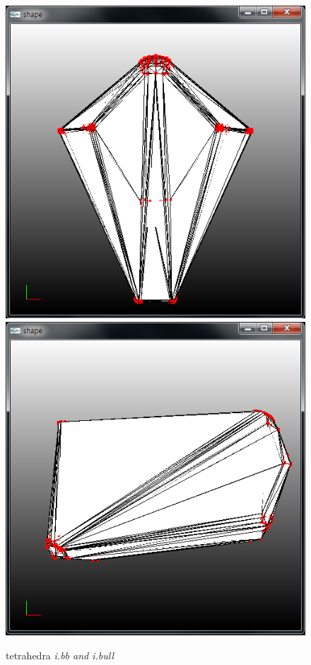 \documentclass[11pt]{article}
\begin{document}
\begin{figure}[h]
\includegraphics[width=.5\textwidth]{FIGS/ibb-tetra}
\hspace{1cm}
\includegraphics[width=.5\textwidth]{FIGS/ibull-tetra}
\caption{tetrahedra \textit{i.bb and i.bull}}
\end{figure}
\end{document}
